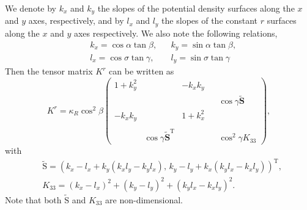 \documentclass[12pt]{report}
\def\tilde{\widetilde}
\def\bs{\boldsymbol}
\def\Sb{\bs{\mathrm{S}}}
\begin{document}
We denote by $k_x$ and $k_y$ the slopes of the potential density
surfaces along the $x$ and $y$ axes, respectively, and by $l_x$ and
$l_y$ the slopes of the constant $r$ surfaces along the $x$ and $y$
axes respectively. We also note the following relations,
\begin{align}\
  &k_x = \cos\alpha\tan\beta, & &k_y =
  \sin\alpha\tan\beta,  \label{eq:42}\\
  &l_x = \cos\sigma\tan\gamma, & &l_y =
  \sin\sigma\tan\gamma  \label{eq:43}
 \end{align}
Then the tensor matrix $K^r$ can be written as 
\begin{equation}
  \label{eq:44}
  K^r = \kappa_R \cos^2\beta\left(
    \begin{matrix}
      1 + k_y^2 & { }  &  -k_xk_y & { } & { }\\
          { }   &     { }   & { } & { } & \cos\gamma{\tilde{\mathbf{S}}}\\
      -k_xk_y & { } & 1 + k_x^2 & { } & { }\\
         { } & { } & { } & { } & { } \\
         { } & \cos\gamma\tilde{\mathbf{S}}^\textrm{T} & { } & { } &
         \cos^2\gamma K_{33}
    \end{matrix}\right),
\end{equation}
with 
\begin{align*}
&  \tilde{\Sb} = \left(k_x- l_x + k_y(k_xl_y - k_yl_x),\, k_y-l_y
    + k_x(k_yl_x - k_xl_y)\right)^\textrm{T},\\
&K_{33} = (k_x - l_x)^2 + (k_y - l_y)^2 + (k_yl_x - k_xl_y)^2.
\end{align*}
Note that both $\tilde{\Sb}$ and $K_{33}$ are non-dimensional.
\end{document}
